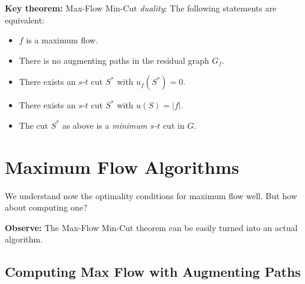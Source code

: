 \documentclass{article}
\begin{document}
\textbf{Key theorem:} Max-Flow Min-Cut {\em duality}: The following statements are equivalent:
\begin{itemize}
\item $f$ is a maximum flow.
\item There is no augmenting paths in the residual graph $G_f$.
\item There exists an $s$-$t$ cut $S^*$ with $u_f(S^*)=0$.
\item There exists an $s$-$t$ cut $S^*$ with $u(S)=|f|$. 
\item The cut $S^*$ as above is a {\em minimum $s$-$t$} cut in $G$.
\end{itemize}

\section{Maximum Flow Algorithms}

We understand now the optimality conditions for maximum flow well. But how about computing one?

\textbf{Observe:} The Max-Flow Min-Cut theorem can be easily turned into an actual algorithm. 

\subsection{Computing Max Flow with Augmenting Paths}
\end{document}
